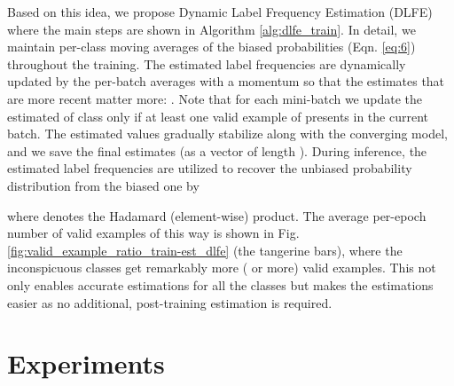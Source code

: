 \documentclass[sigconf]{acmart}
\begin{document}
Based on this idea, we propose Dynamic Label Frequency Estimation (DLFE) where the main steps are shown in Algorithm \ref{alg:dlfe_train}.
In detail, we maintain per-class moving averages of the biased probabilities (Eqn. \ref{eq:6}) throughout the training.
The estimated label frequencies  are dynamically updated by the per-batch averages  with a momentum  so that the estimates that are more recent matter more: .
Note that for each mini-batch we update the estimated  of class  only if at least one valid example of  presents in the current batch.
The estimated values gradually stabilize along with the converging model, and we save the final estimates  (as a vector of length ).
During inference, the estimated label frequencies are utilized to recover the unbiased probability distribution  from the biased one  by

where  denotes the Hadamard (element-wise) product.
The average per-epoch number of valid examples of this way is shown in Fig. \ref{fig:valid_example_ratio_train-est_dlfe} (the tangerine bars), where the inconspicuous classes get remarkably more ( or more) valid examples.
This not only enables accurate estimations for all the classes but makes the estimations easier as no additional, post-training estimation is required.

\section{Experiments}
\end{document}
